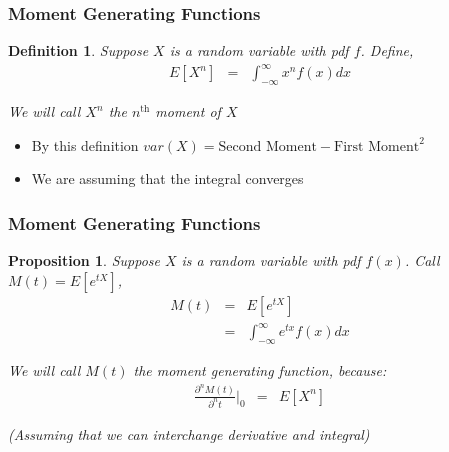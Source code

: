\documentclass{beamer}
\newtheorem{prop}{Proposition}
\newtheorem{defn}{Definition}
\numberwithin{equation}{section}
\begin{document}
\begin{frame}
\frametitle{Moment Generating Functions}


\begin{defn}
Suppose $X$ is a random variable with pdf $f$.  Define, 
\begin{eqnarray}
E[X^{n}] & = & \int_{-\infty}^{\infty} x^{n} f(x) dx   \nonumber 
\end{eqnarray}

We will call $X^{n}$ the \alert{$n^{\text{th}}$} moment of $X$ 

\end{defn}

\begin{itemize}
\item[-] By this definition $var(X) = \text{Second Moment} - \text{First Moment}^{2} $
\item[-] We are assuming that the integral converges
\end{itemize}

\end{frame}


\begin{frame}
\frametitle{Moment Generating Functions}

\begin{prop}
Suppose $X$ is a random variable with pdf $f(x)$.  Call $M(t) = E[e^{tX}]$, 
\begin{eqnarray}
M(t) & = & E[e^{tX}] \nonumber \\
 & = & \int_{-\infty}^{\infty} e^{tx} f(x) dx \nonumber 
 \end{eqnarray}

We will call $M(t)$ the moment generating function, because:
\begin{eqnarray}
\frac{\partial^{n} M (t) }{\partial^{n} t}|_{0} & = & E[X^{n}] \nonumber 
\end{eqnarray}

(Assuming that we can interchange derivative and integral)

\end{prop}



\end{frame}
\end{document}
